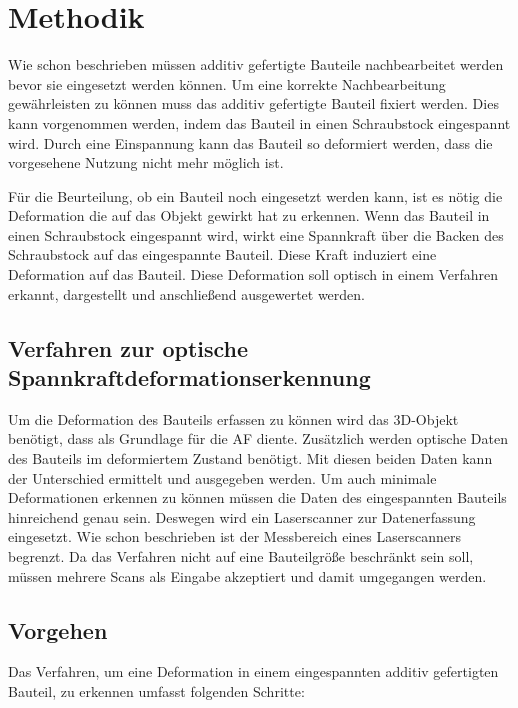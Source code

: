 

\chapter{Methodik}

Wie schon beschrieben müssen additiv gefertigte Bauteile nachbearbeitet werden
bevor sie eingesetzt werden können. 
Um eine korrekte Nachbearbeitung gewährleisten zu können muss das additiv 
gefertigte Bauteil fixiert werden. 
Dies kann vorgenommen werden, indem das Bauteil in einen Schraubstock eingespannt wird.
Durch eine Einspannung kann das Bauteil so deformiert werden, 
dass die vorgesehene Nutzung nicht mehr möglich ist. 

Für die Beurteilung, ob ein Bauteil noch eingesetzt werden kann, ist es nötig die 
Deformation die auf das Objekt gewirkt hat zu erkennen. Wenn das Bauteil in einen 
Schraubstock eingespannt wird, wirkt eine Spannkraft über die Backen des Schraubstock
auf das eingespannte Bauteil.
Diese Kraft induziert eine Deformation auf das Bauteil. 
Diese Deformation soll optisch in einem Verfahren erkannt, dargestellt und 
anschließend ausgewertet werden.

\section{Verfahren zur optische Spannkraftdeformationserkennung}

Um die Deformation des Bauteils erfassen zu können wird das 3D-Objekt benötigt, 
dass als Grundlage für die AF diente. Zusätzlich werden optische Daten des Bauteils 
im deformiertem Zustand benötigt. Mit diesen beiden Daten kann der Unterschied 
ermittelt und ausgegeben werden.
Um auch minimale Deformationen erkennen zu können müssen die Daten des 
eingespannten Bauteils hinreichend genau sein. Deswegen wird ein Laserscanner zur 
Datenerfassung eingesetzt.
Wie schon beschrieben ist der Messbereich eines Laserscanners begrenzt. Da das 
Verfahren nicht auf eine Bauteilgröße beschränkt sein soll, müssen mehrere Scans als 
Eingabe akzeptiert und damit umgegangen werden.

\section{Vorgehen}

Das Verfahren, um eine Deformation in einem eingespannten additiv gefertigten
Bauteil, zu erkennen umfasst folgenden Schritte:

